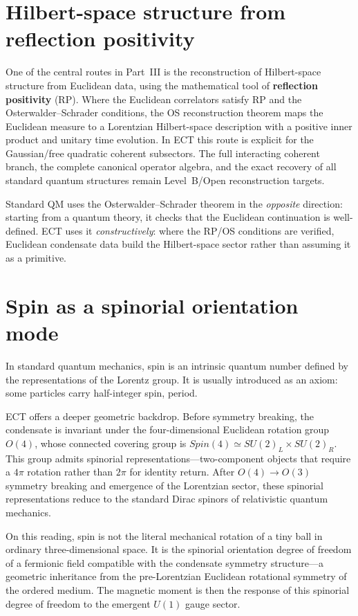 \documentclass[11pt,a4paper]{article}
\begin{document}
\section{Hilbert-space structure from reflection positivity}

One of the central routes in Part~III is the reconstruction of Hilbert-space structure from Euclidean data, using the mathematical tool of \textbf{reflection positivity} (RP). Where the Euclidean correlators satisfy RP and the Osterwalder--Schrader conditions, the OS reconstruction theorem maps the Euclidean measure to a Lorentzian Hilbert-space description with a positive inner product and unitary time evolution. In ECT this route is explicit for the Gaussian/free quadratic coherent subsectors. The full interacting coherent branch, the complete canonical operator algebra, and the exact recovery of all standard quantum structures remain Level~B/Open reconstruction targets.

Standard QM uses the Osterwalder--Schrader theorem in the \emph{opposite} direction: starting from a quantum theory, it checks that the Euclidean continuation is well-defined. ECT uses it \emph{constructively}: where the RP/OS conditions are verified, Euclidean condensate data build the Hilbert-space sector rather than assuming it as a primitive.


\section{Spin as a spinorial orientation mode}
\label{sec:pop_spin}

In standard quantum mechanics, spin is an intrinsic quantum number defined by the representations of the Lorentz group.
It is usually introduced as an axiom: some particles carry half-integer spin, period.

ECT offers a deeper geometric backdrop.
Before symmetry breaking, the condensate is invariant under the four-dimensional Euclidean rotation group $O(4)$, whose connected covering group is $Spin(4) \simeq SU(2)_L \times SU(2)_R$.
This group admits spinorial representations---two-component objects that require a $4\pi$ rotation rather than $2\pi$ for identity return.
After $O(4) \to O(3)$ symmetry breaking and emergence of the Lorentzian sector, these spinorial representations reduce to the standard Dirac spinors of relativistic quantum mechanics.

On this reading, spin is not the literal mechanical rotation of a tiny ball in ordinary three-dimensional space.
It is the spinorial orientation degree of freedom of a fermionic field compatible with the condensate symmetry structure---a geometric inheritance from the pre-Lorentzian Euclidean rotational symmetry of the ordered medium.
The magnetic moment is then the response of this spinorial degree of freedom to the emergent $U(1)$ gauge sector.
\end{document}
